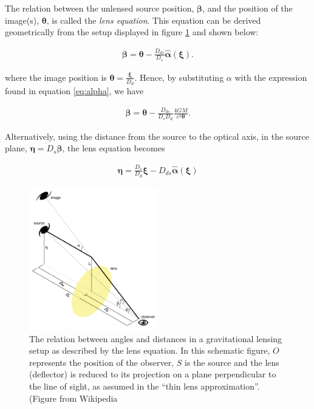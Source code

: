\documentclass[paper=a4, fontsize=11pt]{scrartcl} %
\numberwithin{equation}{section} %
\numberwithin{figure}{section} %
\numberwithin{table}{section} %
\begin{document}
The relation between the unlensed source position, $\boldsymbol \beta$, and the position of the image(s), $\boldsymbol \theta$, is called the \emph{lens equation}. This equation can be derived geometrically from the setup displayed in figure \ref{fig:config} and shown below:

\begin{eqnarray}
\label{eq:lens_eq_angle}
\boldsymbol \beta = \boldsymbol \theta - \frac{D_{ds}}{D_s} \hat{\boldsymbol \alpha}(\boldsymbol \xi).
\end{eqnarray}

 where the image position is $\boldsymbol \theta = \frac{\boldsymbol \xi}{D_{d}}$. Hence, by substituting $\alpha$ with the expression found in equation \ref{eq:alpha}, we have

 \begin{eqnarray}
 \label{eq:lens_equation}
 \boldsymbol \beta = \boldsymbol \theta - \frac{D_{ds}}{D_s D_d} \frac{4GM}{c^2 \boldsymbol \theta}.
 \end{eqnarray}

 Alternatively, using the distance from the source to the optical axis, in the source plane,  $\boldsymbol \eta = D_{s} \boldsymbol \beta$, the lens equation becomes

\begin{eqnarray}
\label{eq:lens_eq_distance}
\boldsymbol \eta = \frac{D_s}{D_d}\boldsymbol \xi - D_{ds}\hat{\boldsymbol \alpha}(\boldsymbol \xi)
\end{eqnarray}

\begin{figure}[][t]
 \label{fig:config}
 \centering
\includegraphics[width=0.5\textwidth]{figs/Gravitational-lensing-angles}
 \caption{The relation between angles and distances in a gravitational lensing setup as described by the lens equation. In this schematic figure, $O$ represents the position of the observer, $S$ is the source and the lens (deflector) is reduced to its projection on a plane perpendicular to the line of sight, as assumed in the ``thin lens approximation''. (Figure from Wikipedia}
 \end{figure}
\end{document}
